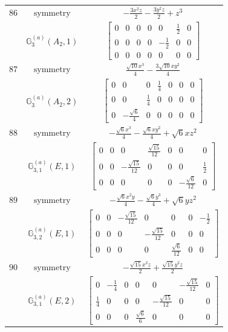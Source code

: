 \documentclass[fleqn,8pt,landscape]{jsarticle}
\begin{document}
\begin{longtable}{ccc}
$ 86 $ & $ \text{symmetry} $ & $ - \frac{3 x^{2} z}{2} - \frac{3 y^{2} z}{2} + z^{3} $ \\
$  $ & $ \mathbb{G}_{3}^{(a)}(A_{2},1) $ & $ \begin{bmatrix} 0 & 0 & 0 & 0 & 0 & \frac{1}{2} & 0 \\ 0 & 0 & 0 & 0 & - \frac{1}{2} & 0 & 0 \\ 0 & 0 & 0 & 0 & 0 & 0 & 0 \end{bmatrix} $ \\ \hline
$ 87 $ & $ \text{symmetry} $ & $ \frac{\sqrt{10} x^{3}}{4} - \frac{3 \sqrt{10} x y^{2}}{4} $ \\
$  $ & $ \mathbb{G}_{3}^{(a)}(A_{2},2) $ & $ \begin{bmatrix} 0 & 0 & 0 & \frac{1}{4} & 0 & 0 & 0 \\ 0 & 0 & \frac{1}{4} & 0 & 0 & 0 & 0 \\ 0 & - \frac{\sqrt{6}}{4} & 0 & 0 & 0 & 0 & 0 \end{bmatrix} $ \\ \hline
$ 88 $ & $ \text{symmetry} $ & $ - \frac{\sqrt{6} x^{3}}{4} - \frac{\sqrt{6} x y^{2}}{4} + \sqrt{6} x z^{2} $ \\
$  $ & $ \mathbb{G}_{3,1}^{(a)}(E,1) $ & $ \begin{bmatrix} 0 & 0 & 0 & \frac{\sqrt{15}}{12} & 0 & 0 & 0 \\ 0 & 0 & - \frac{\sqrt{15}}{12} & 0 & 0 & 0 & \frac{1}{2} \\ 0 & 0 & 0 & 0 & 0 & - \frac{\sqrt{6}}{12} & 0 \end{bmatrix} $ \\ \hline
$ 89 $ & $ \text{symmetry} $ & $ - \frac{\sqrt{6} x^{2} y}{4} - \frac{\sqrt{6} y^{3}}{4} + \sqrt{6} y z^{2} $ \\
$  $ & $ \mathbb{G}_{3,2}^{(a)}(E,1) $ & $ \begin{bmatrix} 0 & 0 & - \frac{\sqrt{15}}{12} & 0 & 0 & 0 & - \frac{1}{2} \\ 0 & 0 & 0 & - \frac{\sqrt{15}}{12} & 0 & 0 & 0 \\ 0 & 0 & 0 & 0 & \frac{\sqrt{6}}{12} & 0 & 0 \end{bmatrix} $ \\ \hline
$ 90 $ & $ \text{symmetry} $ & $ - \frac{\sqrt{15} x^{2} z}{2} + \frac{\sqrt{15} y^{2} z}{2} $ \\
$  $ & $ \mathbb{G}_{3,1}^{(a)}(E,2) $ & $ \begin{bmatrix} 0 & - \frac{1}{4} & 0 & 0 & 0 & - \frac{\sqrt{15}}{12} & 0 \\ \frac{1}{4} & 0 & 0 & 0 & - \frac{\sqrt{15}}{12} & 0 & 0 \\ 0 & 0 & 0 & \frac{\sqrt{6}}{6} & 0 & 0 & 0 \end{bmatrix} $ \\ \hline

\end{longtable}
\end{document}
